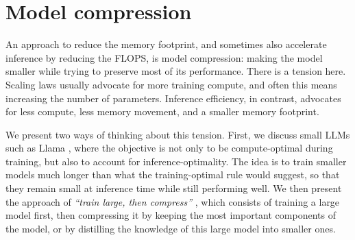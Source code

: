 \section{Model compression}\label{sec:llm_compression}
An approach to reduce the memory footprint, and sometimes also accelerate inference by reducing the FLOPS,
is model compression: making the model smaller while trying to preserve most of its performance.
There is a tension here. Scaling laws \citep{kaplan2020scaling, hoffmann2022training} usually advocate for more training compute, and often this means
increasing the number of parameters. Inference efficiency, in contrast, advocates for less compute,
less memory movement, and a smaller memory footprint.

We present two ways of thinking about this tension. First, we discuss small LLMs such as Llama 
\citep{touvron2023llamaopenefficientfoundation, touvron2023llama2openfoundation, grattafiori2024llama3herdmodels},
where the objective is not only to be compute-optimal during training, but also to account for
inference-optimality. The idea is to train smaller models much longer than what the training-optimal
rule would suggest, so that they remain small at inference time while still performing well.
We then present the approach of \textit{``train large, then compress''} \citep{li2020trainlargecompressrethinking}, 
which consists of training a large model first, then compressing it by keeping the most important components of the model,
or by distilling the knowledge of this large model into smaller ones.


